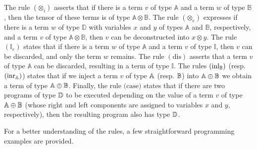 The rule $(\mathbb{\otimes}_i)$  asserts that if there is a term $v$ of type $\mathbb{A}$ and a term $w$ of type $\mathbb{B}$,  then the tensor of these terms is of type $\mathbb{A} \otimes \mathbb{B}$.
The rule $(\mathbb{\otimes}_e)$ expresses if there is a term $w$ of type $\mathbb{D}$ with variables $x$ and $y$ of types $\mathbb{A}$ and $\mathbb{B}$, respectively, and a term $v$ of type $\mathbb{A} \otimes \mathbb{B}$, then $v$ can be deconstructed into $x \otimes y$. 
The rule $(\mathbb{I}_e)$ states that if there is a term $w$ of type $\mathbb{A}$ and a term $v$ of type $\mathbb{I}$, then $v$ can be discarded, and only the term $w$ remains. 
The rule $(\text{dis})$ asserts that a term $v$ of type $\mathbb{A}$ can be discarded, resulting in a term of type $\mathbb{I}$. The rules $(\text{inl}_{\mathbb{B}})$ (resp. $(\text{inr}_{\mathbb{A}})$) states that if we inject a term $v$ of type $\mathbb{A}$ (resp. $\mathbb{B}$) into $\mathbb{A} \oplus \mathbb{B}$ we obtain a term of type $\mathbb{A} \oplus \mathbb{B}$. 
Finally, the rule $\text{(case)}$ states that if there are two programs of type $\mathbb{D}$ to be executed depending on the value of a term $v$ of type $\mathbb{A} \oplus \mathbb{B}$ (whose right and left components are assigned to variables $x$ and $y$, respectively), then the resulting program also has type $\mathbb{D}$.


For a better understanding of the rules, a few straightforward programming examples are provided.  

